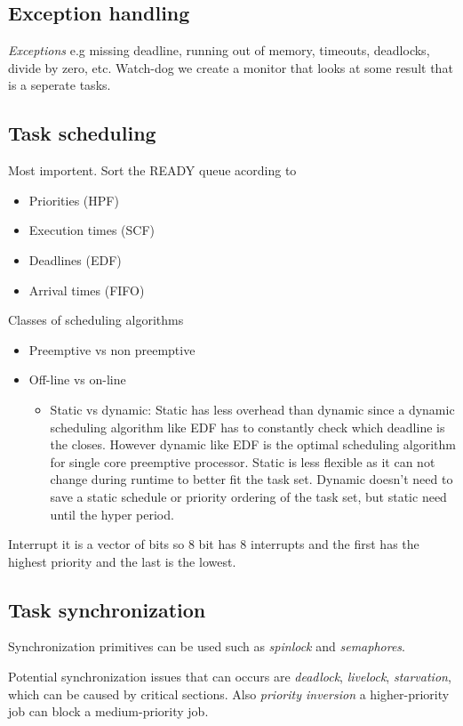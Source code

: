 \subsection{Exception handling}
\textit{Exceptions} e.g missing deadline, running out of memory, timeouts, deadlocks, divide by zero, etc.
Watch-dog we create a monitor that looks at some result that is a seperate tasks.

\subsection{Task scheduling}
Most importent.
Sort the READY queue acording to
\begin{itemize}
\item Priorities (HPF)
\item Execution times (SCF)
\item Deadlines (EDF)
\item Arrival times (FIFO)
\end{itemize}
Classes of scheduling algorithms
\begin{itemize}
\item Preemptive vs non preemptive
\item Off-line vs on-line
  \begin{itemize}
  \item Static vs dynamic: Static has less overhead than dynamic since a dynamic scheduling algorithm like EDF has to constantly check which deadline is the closes.
  However dynamic like EDF is the optimal scheduling algorithm for single core preemptive processor. 
  Static is less flexible as it can not change during runtime to better fit the task set.
  Dynamic doesn't need to save a static schedule or priority ordering of the task set, but static need until the hyper period.
  \end{itemize}
\end{itemize}

Interrupt it is a vector of bits so 8 bit has 8 interrupts
and the first has the highest priority and the last is the lowest.

\subsection{Task synchronization}
Synchronization primitives can be used such as \textit{spinlock} and \textit{semaphores}.

Potential synchronization issues that can occurs are \textit{deadlock}, \textit{livelock}, 
\textit{starvation}, which can be caused by critical sections. Also \textit{priority inversion} a higher-priority job can block a medium-priority job.


